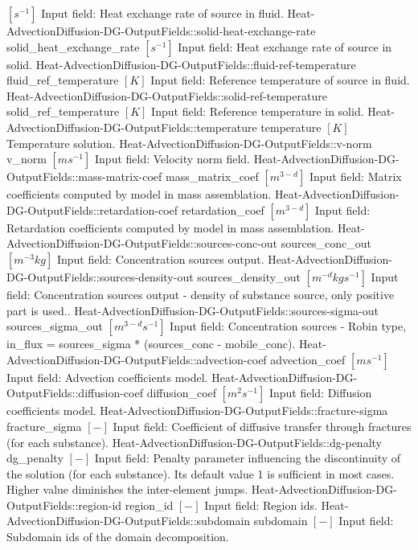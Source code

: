 \begin{SelectionType}
			{{{}{$[s^{-1}]$}{ Input field: Heat exchange rate of source in fluid.}%
}}
		\SelectionItem
			{Heat-AdvectionDiffusion-DG-OutputFields::solid-heat-exchange-rate}
			{solid{\_}heat{\_}exchange{\_}rate}
			{{{}{$[s^{-1}]$}{ Input field: Heat exchange rate of source in solid.}%
}}
		\SelectionItem
			{Heat-AdvectionDiffusion-DG-OutputFields::fluid-ref-temperature}
			{fluid{\_}ref{\_}temperature}
			{{{}{$[K]$}{ Input field: Reference temperature of source in fluid.}%
}}
		\SelectionItem
			{Heat-AdvectionDiffusion-DG-OutputFields::solid-ref-temperature}
			{solid{\_}ref{\_}temperature}
			{{{}{$[K]$}{ Input field: Reference temperature in solid.}%
}}
		\SelectionItem
			{Heat-AdvectionDiffusion-DG-OutputFields::temperature}
			{temperature}
			{{{}{$[K]$}{ Temperature solution.}%
}}
		\SelectionItem
			{Heat-AdvectionDiffusion-DG-OutputFields::v-norm}
			{v{\_}norm}
			{{{}{$[ms^{-1}]$}{ Input field: Velocity norm field.}%
}}
		\SelectionItem
			{Heat-AdvectionDiffusion-DG-OutputFields::mass-matrix-coef}
			{mass{\_}matrix{\_}coef}
			{{{}{$[m^{3-d}]$}{ Input field: Matrix coefficients computed by model in mass assemblation.}%
}}
		\SelectionItem
			{Heat-AdvectionDiffusion-DG-OutputFields::retardation-coef}
			{retardation{\_}coef}
			{{{}{$[m^{3-d}]$}{ Input field: Retardation coefficients computed by model in mass assemblation.}%
}}
		\SelectionItem
			{Heat-AdvectionDiffusion-DG-OutputFields::sources-conc-out}
			{sources{\_}conc{\_}out}
			{{{}{$[m^{-3}kg]$}{ Input field: Concentration sources output.}%
}}
		\SelectionItem
			{Heat-AdvectionDiffusion-DG-OutputFields::sources-density-out}
			{sources{\_}density{\_}out}
			{{{}{$[m^{-d}kgs^{-1}]$}{ Input field: Concentration sources output - density of substance source, only positive part is used..}%
}}
		\SelectionItem
			{Heat-AdvectionDiffusion-DG-OutputFields::sources-sigma-out}
			{sources{\_}sigma{\_}out}
			{{{}{$[m^{3-d}s^{-1}]$}{ Input field: Concentration sources - Robin type, in{\_}flux = sources{\_}sigma * (sources{\_}conc - mobile{\_}conc).}%
}}
		\SelectionItem
			{Heat-AdvectionDiffusion-DG-OutputFields::advection-coef}
			{advection{\_}coef}
			{{{}{$[ms^{-1}]$}{ Input field: Advection coefficients model.}%
}}
		\SelectionItem
			{Heat-AdvectionDiffusion-DG-OutputFields::diffusion-coef}
			{diffusion{\_}coef}
			{{{}{$[m^{2}s^{-1}]$}{ Input field: Diffusion coefficients model.}%
}}
		\SelectionItem
			{Heat-AdvectionDiffusion-DG-OutputFields::fracture-sigma}
			{fracture{\_}sigma}
			{{{}{$[-]$}{ Input field: Coefficient of diffusive transfer through fractures (for each substance).}%
}}
		\SelectionItem
			{Heat-AdvectionDiffusion-DG-OutputFields::dg-penalty}
			{dg{\_}penalty}
			{{{}{$[-]$}{ Input field: Penalty parameter influencing the discontinuity of the solution (for each substance). Its default value 1 is sufficient in most cases.
Higher value diminishes the inter-element jumps.}%
}}
		\SelectionItem
			{Heat-AdvectionDiffusion-DG-OutputFields::region-id}
			{region{\_}id}
			{{{}{$[-]$}{ Input field: Region ids.}%
}}
		\SelectionItem
			{Heat-AdvectionDiffusion-DG-OutputFields::subdomain}
			{subdomain}
			{{{}{$[-]$}{ Input field: Subdomain ids of the domain decomposition.}%
}}
\end{SelectionType}
